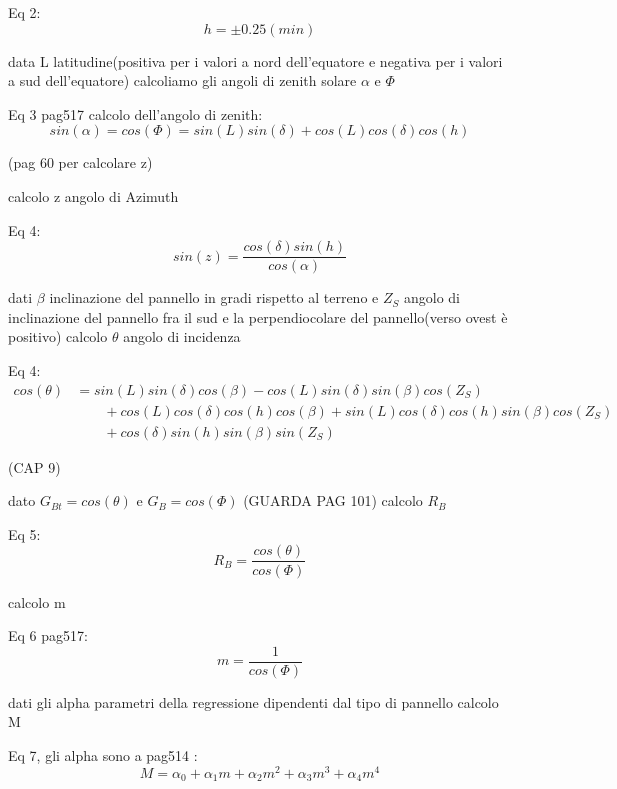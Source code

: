 \documentclass{article}
\begin{document}
Eq 2:
\begin{equation}
    h=\pm 0.25(min)
\end{equation}

data L latitudine(positiva per i valori a nord dell'equatore e negativa per i valori a sud dell'equatore) calcoliamo gli angoli di zenith solare $\alpha$ e $\Phi$

Eq 3 pag517 calcolo dell'angolo di zenith:
\begin{equation}
    sin(\alpha)=cos(\Phi)=sin(L)sin(\delta)+cos(L)cos(\delta)cos(h)
\end{equation}

(pag 60 per calcolare z)

calcolo z angolo di Azimuth

Eq 4:
\begin{equation}
    sin(z)=\frac{cos(\delta)sin(h)}{cos(\alpha)}
\end{equation}

dati $\beta$ inclinazione del pannello in gradi rispetto al terreno e $Z_{S}$ angolo di inclinazione del pannello fra il sud e la perpendiocolare del pannello(verso ovest è positivo) calcolo $\theta$ angolo di incidenza

Eq 4:
\begin{equation} \begin{split}
    cos(\theta)&=sin(L)sin(\delta)cos(\beta)-cos(L)sin(\delta)sin(\beta)cos(Z_{S}) \\
    &\qquad +cos(L)cos(\delta)cos(h)cos(\beta)+sin(L)cos(\delta)cos(h)sin(\beta)cos(Z_{S}) \\
    &\qquad +cos(\delta)sin(h)sin(\beta)sin(Z_{S})
\end{split}\end{equation}

(CAP 9)

dato $G_{Bt}=cos(\theta) $ e $G_{B}=cos(\Phi)$ (GUARDA PAG 101) calcolo $R_{B}$

Eq 5:
\begin{equation}
    R_{B}=\frac{cos(\theta)}{cos(\Phi)}
\end{equation}

calcolo m

Eq 6 pag517:
\begin{equation}
   m=\frac{1}{cos(\Phi)}
\end{equation}

dati gli alpha parametri della regressione dipendenti dal tipo di pannello calcolo M

Eq 7, gli alpha sono a pag514 :
\begin{equation}
    M=\alpha_{0}+\alpha_{1}m+\alpha_{2}m^2+\alpha_{3}m^3+\alpha_{4}m^4
\end{equation}
\end{document}
